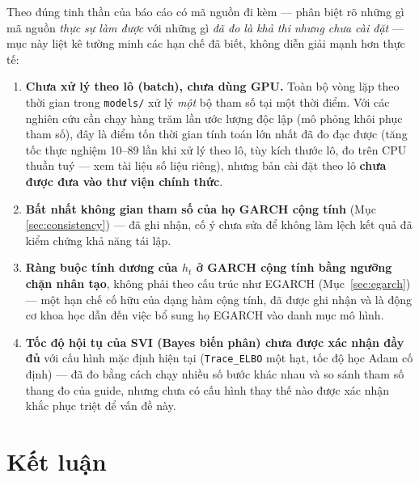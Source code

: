 \documentclass[11pt,a4paper]{article}
\newcommand{\code}[1]{\texttt{#1}}
\begin{document}
Theo đúng tinh thần của báo cáo có mã nguồn đi kèm --- phân biệt rõ những gì mã nguồn
\emph{thực sự làm được} với những gì \emph{đã đo là khả thi nhưng chưa cài đặt} ---
mục này liệt kê tường minh các hạn chế đã biết, không diễn giải mạnh hơn thực tế:

\begin{enumerate}
  \item \textbf{Chưa xử lý theo lô (batch), chưa dùng GPU.} Toàn bộ vòng lặp theo
    thời gian trong \code{models/} xử lý \emph{một} bộ tham số tại một thời điểm.
    Với các nghiên cứu cần chạy hàng trăm lần ước lượng độc lập (mô phỏng khôi phục
    tham số), đây là điểm tốn thời gian tính toán lớn nhất đã đo đạc được (tăng tốc
    thực nghiệm 10--89 lần khi xử lý theo lô, tùy kích thước lô, đo trên CPU thuần
    tuý --- xem tài liệu số liệu riêng), nhưng bản cài đặt theo lô \textbf{chưa được
    đưa vào thư viện chính thức}.
  \item \textbf{Bất nhất không gian tham số của họ GARCH cộng tính} (Mục
    \ref{sec:consistency}) --- đã ghi nhận, cố ý chưa sửa để không làm lệch kết quả
    đã kiểm chứng khả năng tái lập.
  \item \textbf{Ràng buộc tính dương của $h_t$ ở GARCH cộng tính bằng ngưỡng chặn
    nhân tạo}, không phải theo cấu trúc như EGARCH (Mục~\ref{sec:egarch}) --- một
    hạn chế cố hữu của dạng hàm cộng tính, đã được ghi nhận và là động cơ khoa học
    dẫn đến việc bổ sung họ EGARCH vào danh mục mô hình.
  \item \textbf{Tốc độ hội tụ của SVI (Bayes biến phân) chưa được xác nhận đầy đủ}
    với cấu hình mặc định hiện tại (\code{Trace\_ELBO} một hạt, tốc độ học Adam cố
    định) --- đã đo bằng cách chạy nhiều số bước khác nhau và so sánh tham số thang
    đo của guide, nhưng chưa có cấu hình thay thế nào được xác nhận khắc phục triệt
    để vấn đề này.
\end{enumerate}

\section{Kết luận}
\end{document}
